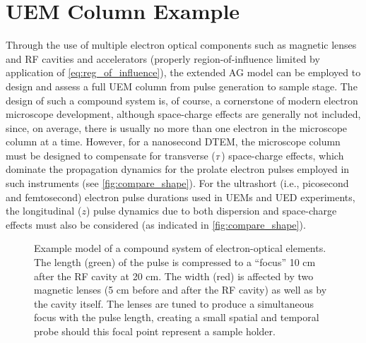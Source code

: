 
\section{UEM Column Example} \label{sec:compound}

Through the use of multiple electron optical components such as magnetic lenses and RF cavities and accelerators (properly region-of-influence limited by application of \ref{eq:reg_of_influence}), the extended AG model can be employed to design and assess a full UEM column from pulse generation to sample stage.
The design of such a compound system is, of course, a cornerstone of modern electron microscope development, although space-charge effects are generally not included, since, on average, there is usually no more than one electron in the microscope column at a time.
However, for a nanosecond DTEM,\cite{lagrange_nanosecond_2008,reed_evolution_2009} the microscope column must be designed to compensate for transverse (${\scriptscriptstyle T}$) space-charge effects, which dominate the propagation dynamics for the prolate electron pulses employed in such instruments (see \ref{fig:compare_shape}).
For the ultrashort (i.e., picosecond and femtosecond) electron pulse durations used in UEMs\cite{park_direct_2009} and UED experiments,\cite{oudheusden_electron_2007} the longitudinal ($z$) pulse dynamics due to both dispersion and space-charge effects must also be considered (as indicated in \ref{fig:compare_shape}).

\begin{figure}
  \centering
  
  \caption[Example model of a compound system of electron-optical elements]{
    Example model of a compound system of electron-optical elements.
    The length (green) of the pulse is compressed to a ``focus'' 10 cm after the RF cavity at 20 cm.
    The width (red) is affected by two magnetic lenses (5 cm before and after the RF cavity) as well as by the cavity itself.
    The lenses are tuned to produce a simultaneous focus with the pulse length, creating a small spatial and temporal probe should this focal point represent a sample holder.
  }
  \label{fig:compound}
\end{figure}

